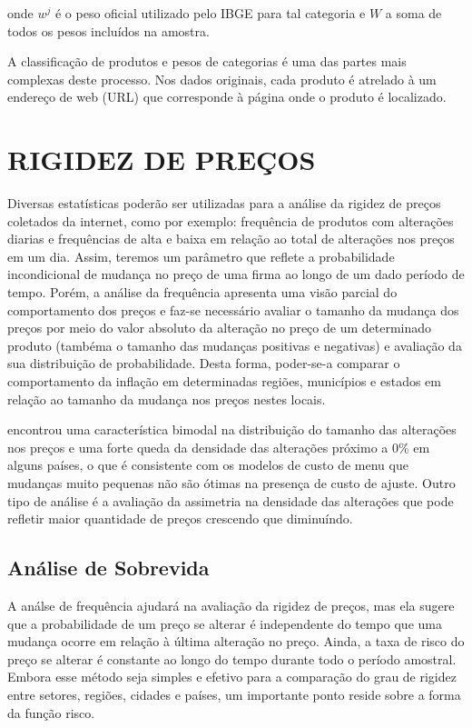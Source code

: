 \documentclass[twoside,a4paper,11pt]{report}
\begin{document}
\noindent onde $w^{j}$ é o peso oficial utilizado pelo IBGE para tal categoria e $W$ a soma de todos os pesos incluídos na amostra.

A classificação de produtos e pesos de categorias é uma das partes mais complexas deste processo. Nos dados originais, cada produto é atrelado à um endereço de web (URL) que corresponde à página onde o produto é localizado. 

\section*{RIGIDEZ DE PREÇOS}

 Diversas estatísticas poderão ser utilizadas para a análise da rigidez de preços coletados da internet, como por exemplo: frequência de produtos com alterações diarias e frequências de alta e baixa em relação ao total de alterações nos preços em um dia. Assim, teremos um parâmetro que reflete a probabilidade incondicional de mudança no preço de uma firma ao longo de um dado período de tempo. Porém, a análise da frequência apresenta uma visão parcial do comportamento dos preços e faz-se necessário avaliar o tamanho da mudança dos preços por meio do valor absoluto da alteração no preço de um determinado produto (tambéma o tamanho das mudanças positivas e negativas) e avaliação da sua distribuição de probabilidade. Desta forma, poder-se-a comparar o comportamento da inflação em determinadas regiões, municípios e estados em relação ao tamanho da mudança nos preços nestes locais. 
 
\citet{cavallo2010scraped} encontrou uma característica bimodal na distribuição do tamanho das alterações nos preços e uma forte queda da densidade das alterações próximo a 0\% em alguns países, o que é consistente com os modelos de custo de menu que mudanças muito pequenas não são ótimas na presença de custo de ajuste. Outro tipo de análise é a avaliação da assimetria na densidade das alterações que pode refletir maior quantidade de preços crescendo que diminuíndo. 
 
\subsection*{Análise de Sobrevida}

A análse de frequência ajudará na avaliação da rigidez de preços, mas ela sugere que a probabilidade de um preço se alterar é independente do tempo que uma mudança ocorre em relação à última alteração no preço. Ainda, a taxa de risco do preço se alterar é constante ao longo do tempo durante todo o período amostral. Embora esse método seja simples e efetivo para a comparação do grau de rigidez entre setores, regiões, cidades e países, um importante ponto reside sobre a forma da função risco. 
\end{document}
